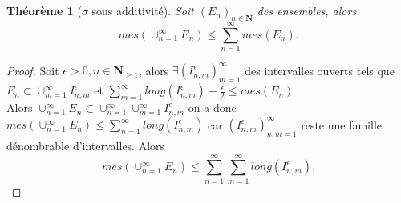\documentclass[12pt]{book}
\newtheorem{theorem}[lemma]{Théorème}
\theoremstyle{definition}
\theoremstyle{remark}
\begin{document}
\begin{theorem}[$\sigma$ sous additivité]
	Soit $(E_n)_{n\in \mathbf{N}}$ des ensembles, alors  \[
		mes(\cup_{n=1}^{\infty}E_n) \le \sum_{n=1}^{\infty}mes(E_n)
	.\] 	
	\end{theorem}	
	\begin{proof}
		Soit $\epsilon >0, n \in \mathbf{N}_{\ge 1}$, alors $\exists (I_{n,m}^{\epsilon})_{m=1}^{\infty}$ des intervalles ouverts tels que $E_n \subset \cup_{m=1}^{\infty}I_{n,m}^{\epsilon}$ et $\sum_{m=1}^{\infty}long(I_{n,m}^{\epsilon}) - \frac{\epsilon}{2} \le mes(E_n)$\\
		Alors $\cup_{n=1}^{\infty} E_n \subset \cup_{n=1}^{\infty}\cup_{m=1}^{\infty}I_{n,m}^{\epsilon}$ on a donc $mes(\cup_{n=1}^{\infty}E_n) \le \sum_{n=1}^{\infty} long(I_{n,m}^{\epsilon})$ car $(I_{n,m}^{\epsilon})_{n,m=1}^{\infty}$ reste une famille dénombrable d'intervalles. Alors \[
			mes(\cup_{n=1}^{\infty}E_n) \le \sum_{n=1}^{\infty} \sum_{m=1}^{\infty} long(I_{n,m}^{\epsilon}) 
		.\] 
	\end{proof}
\end{document}

